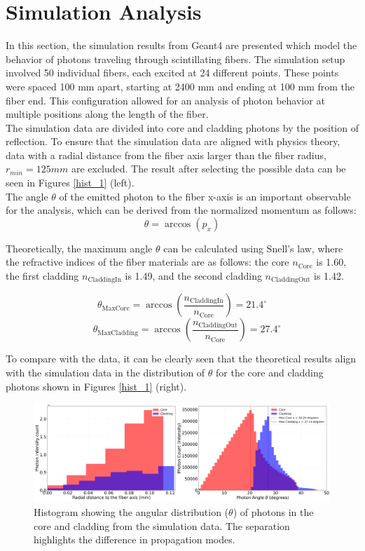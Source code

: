     \section{Simulation Analysis}

    In this section, the simulation results from Geant4 are presented which model the behavior of photons traveling through scintillating fibers. The simulation setup involved 50 individual fibers, each excited at 24 different points. These points were spaced 100 mm apart, starting at 2400 mm and ending at 100 mm from the fiber end. This configuration allowed for an analysis of photon behavior at multiple positions along the length of the fiber.\\
    
    The simulation data are divided into core and cladding photons by the position of reflection. To ensure that the simulation data are aligned with physics theory, data with a radial distance from the fiber axis larger than the fiber radius,$r_{min} = 125 mm$ are excluded. The result after selecting the possible data can be seen in Figures \ref{hist_1} (left). \\

    The angle $\theta$ of the emitted photon to the fiber x-axis is an important observable for the analysis, which can be derived from the normalized momentum as follows:
    \[
        \theta = \arccos(p_x)
    \]
    
    Theoretically, the maximum angle $\theta$ can be calculated using Snell's law, where the refractive indices of the fiber materials are as follows: the core $n_{\text{Core}}$ is 1.60, the first cladding $n_{\text{CladdingIn}}$ is 1.49, and the second cladding $n_{\text{CladdingOut}}$ is 1.42.

    \[
    \theta_{\text{MaxCore}} = \arccos\left(\frac{n_{\text{CladdingIn}}}{n_{\text{Core}}}\right) = 21.4^\circ
    \]
    \[\quad \theta_{\text{MaxCladding}} = \arccos\left(\frac{n_{\text{CladdingOut}}}{n_{\text{Core}}}\right) = 27.4^\circ
    \]

    To compare with the data, it can be clearly seen that the theoretical results align with the simulation data in the distribution of $\theta$ for the core and cladding photons shown in Figures \ref{hist_1} (right).
    
    \begin{figure}[H]
        \centering
        \includegraphics[width=1.0\textwidth]{Figure/photon_combined.png}
        \caption{
        Histogram showing the angular distribution ($\theta$) of photons in the core and cladding from the simulation data. The separation highlights the difference in propagation modes.
        }
        \label{fig:theta_distribution}
    \end{figure}

